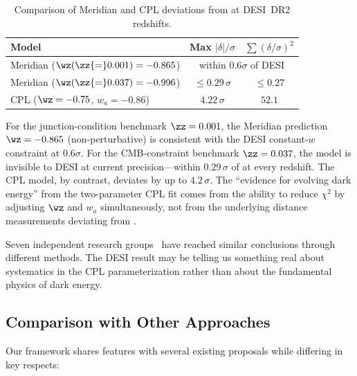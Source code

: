 \begin{table}[h]
\centering
\caption{Comparison of Meridian and CPL deviations from \LCDM{} at DESI~DR2 redshifts.}
\label{tab:1-desi-comparison}
\begin{tabular}{@{}lcc@{}}
\toprule
Model & Max $|\delta|/\sigma$ & $\sum(\delta/\sigma)^2$ \\
\midrule
Meridian ($\wz(\zz{=}0.001) = -0.865$) & \multicolumn{2}{c}{within $0.6\sigma$ of DESI} \\
Meridian ($\wz(\zz{=}0.037) = -0.996$) & $\leq 0.29\,\sigma$ & $\leq 0.27$ \\
CPL ($\wz = -0.75$, $w_a = -0.86$) & $4.22\,\sigma$ & $52.1$ \\
\bottomrule
\end{tabular}
\end{table}

For the junction-condition benchmark $\zz = 0.001$, the Meridian prediction $\wz = -0.865$ (non-perturbative) is consistent with the DESI constant-$w$ constraint at $0.6\sigma$. For the CMB-constraint benchmark $\zz = 0.037$, the model is invisible to DESI at current precision---within $0.29\,\sigma$ of \LCDM{} at every redshift. The CPL model, by contrast, deviates by up to $4.2\,\sigma$. The ``evidence for evolving dark energy'' from the two-parameter CPL fit comes from the ability to reduce $\chi^2$ by adjusting $\wz$ and $w_a$ simultaneously, not from the underlying distance measurements deviating from \LCDM.

Seven independent research groups~\cite{ch1:nesseris25,ch1:gomez25,ch1:lodha24,ch1:hasan25,ch1:mandal25,ch1:andrianomena25,ch1:marques25} have reached similar conclusions through different methods. The DESI result may be telling us something real about systematics in the CPL parameterization rather than about the fundamental physics of dark energy.

\subsection{Comparison with Other Approaches}
\label{sec:1-comparison}

Our framework shares features with several existing proposals while differing in key respects:

